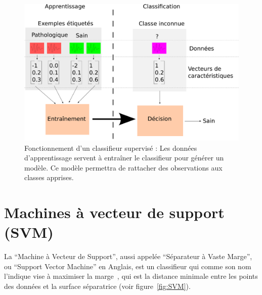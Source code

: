 \begin{figure}[h]
	\begin{center}
	\includegraphics[width=15cm]{images/fonctionnementClassif}
	\end{center}
	\caption[Fonctionnement d'un classifieur supervisé]{Fonctionnement d'un classifieur supervisé : Les données d'apprentissage servent à entraîner le classifieur pour générer un modèle. Ce modèle permettra de rattacher des observations aux classes apprises.}
	\label{fig:fonctClassif}
\end{figure}


	\section{Machines à vecteur de support (SVM)}

\label{lab:SVM}
La ``Machine à Vecteur de Support'', aussi appelée ``Séparateur à Vaste Marge'', ou ``Support Vector Machine'' en Anglais, est un classifieur qui comme son nom l'indique vise à maximiser la marge~\cite{boser1992training}, qui est la distance minimale entre les points des données et la surface séparatrice (voir figure~\ref{fig:SVM}).


